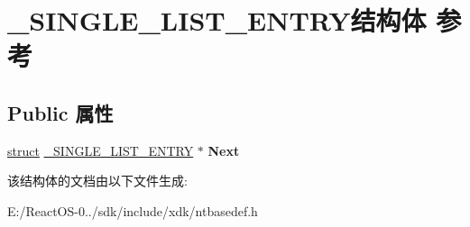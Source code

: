 \hypertarget{struct___s_i_n_g_l_e___l_i_s_t___e_n_t_r_y}{}\section{\+\_\+\+S\+I\+N\+G\+L\+E\+\_\+\+L\+I\+S\+T\+\_\+\+E\+N\+T\+R\+Y结构体 参考}
\label{struct___s_i_n_g_l_e___l_i_s_t___e_n_t_r_y}
\subsection*{Public 属性}
\begin{DoxyCompactItemize}
\item 
\mbox{\label{struct___s_i_n_g_l_e___l_i_s_t___e_n_t_r_y_af401a03617a8b208e4dca67a0f9910da}} 
\hyperlink{interfacestruct}{struct} \hyperlink{struct___s_i_n_g_l_e___l_i_s_t___e_n_t_r_y}{\+\_\+\+S\+I\+N\+G\+L\+E\+\_\+\+L\+I\+S\+T\+\_\+\+E\+N\+T\+RY} $\ast$ {\bfseries Next}
\end{DoxyCompactItemize}


该结构体的文档由以下文件生成\+:\begin{DoxyCompactItemize}
\item 
E\+:/\+React\+O\+S-\/0../sdk/include/xdk/ntbasedef.\+h\end{DoxyCompactItemize}
